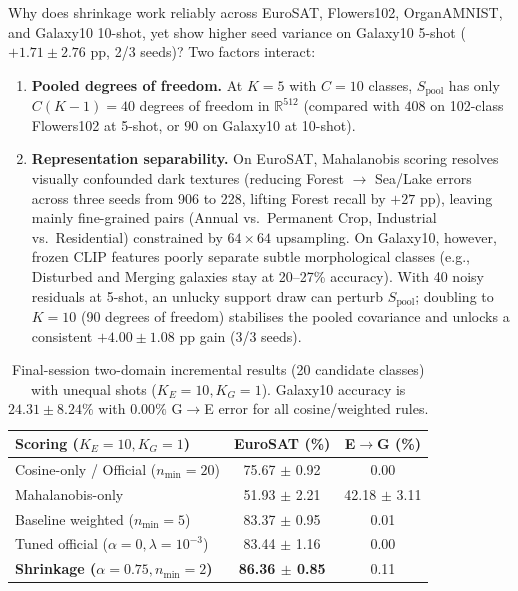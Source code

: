 \documentclass[letterpaper]{article} %
\newcommand{\nmin}{n_{\min}}
\begin{document}
Why does shrinkage work reliably across EuroSAT, Flowers102, OrganAMNIST, and Galaxy10 10-shot, yet show higher seed variance on Galaxy10 5-shot ($+1.71 \pm 2.76$ pp, 2/3 seeds)? Two factors interact:
\begin{enumerate}
\item \textbf{Pooled degrees of freedom.} At $K=5$ with $C=10$ classes, $S_{\mathrm{pool}}$ has only $C(K-1) = 40$ degrees of freedom in $\mathbb{R}^{512}$ (compared with $408$ on 102-class Flowers102 at 5-shot, or $90$ on Galaxy10 at 10-shot).
\item \textbf{Representation separability.} On EuroSAT, Mahalanobis scoring resolves visually confounded dark textures (reducing Forest $\to$ Sea/Lake errors across three seeds from 906 to 228, lifting Forest recall by $+27$ pp), leaving mainly fine-grained pairs (Annual vs.\ Permanent Crop, Industrial vs.\ Residential) constrained by $64\times 64$ upsampling. On Galaxy10, however, frozen CLIP features poorly separate subtle morphological classes (e.g., Disturbed and Merging galaxies stay at 20--27\% accuracy). With 40 noisy residuals at 5-shot, an unlucky support draw can perturb $S_{\mathrm{pool}}$; doubling to $K=10$ (90 degrees of freedom) stabilises the pooled covariance and unlocks a consistent $+4.00 \pm 1.08$ pp gain (3/3 seeds).
\end{enumerate}

\begin{table}[t]
\centering
\footnotesize
\setlength{\tabcolsep}{3pt}
\begin{tabular}{@{}lcc@{}}
\toprule
Scoring ($K_E{=}10, K_G{=}1$) & EuroSAT (\%) & E$\to$G (\%) \\
\midrule
Cosine-only / Official ($\nmin{=}20$) & 75.67 $\pm$ 0.92 & 0.00 \\
Mahalanobis-only & 51.93 $\pm$ 2.21 & 42.18 $\pm$ 3.11 \\
Baseline weighted ($\nmin{=}5$) & 83.37 $\pm$ 0.95 & 0.01 \\
Tuned official ($\alpha{=}0, \lambda{=}10^{-3}$) & 83.44 $\pm$ 1.16 & 0.00 \\
\textbf{Shrinkage ($\alpha{=}0.75, \nmin{=}2$)} & \textbf{86.36 $\pm$ 0.85} & 0.11 \\
\bottomrule
\end{tabular}
\caption{Final-session two-domain incremental results (20 candidate classes) with unequal shots ($K_E = 10, K_G = 1$). Galaxy10 accuracy is $24.31 \pm 8.24\%$ with $0.00\%$ G$\to$E error for all cosine/weighted rules.}
\label{tab:cross}
\end{table}
\end{document}
